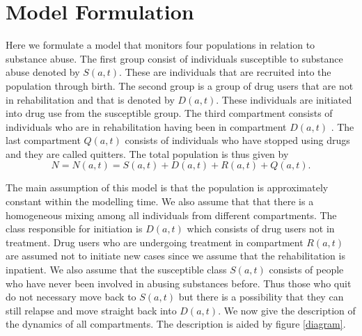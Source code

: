 %
%


\section{Model Formulation}
Here we formulate a model that monitors four populations in relation to substance abuse. The first group consist of individuals  susceptible to substance abuse denoted by $S(a,t)$. These are individuals that are recruited into the population through birth. The second group is a group of drug users that are not in rehabilitation and that is denoted by $D(a,t)$. These individuals are initiated into drug use from the susceptible group. The  third compartment consists of individuals who are in rehabilitation having been in compartment $D(a,t)$ . The last compartment $Q(a,t)$ consists of individuals who have stopped using drugs and they are called  quitters. The total population is thus given by \[N=N(a,t)=S(a,t)+D(a,t)+R(a,t)+Q(a,t).\]

The main assumption of this model is that the population is approximately constant within the modelling time. We also assume that that there is a homogeneous mixing among all individuals from different compartments. The class responsible for initiation is $D(a,t)$ which consists of drug users not in treatment. Drug users who are undergoing treatment in compartment $R(a,t)$ are assumed not to initiate new cases  since we assume that the rehabilitation is inpatient. We also assume that the susceptible class $S(a,t)$ consists of people who have never been involved in abusing substances before. Thus those who quit do not necessary move back to $S(a,t)$ but there is a possibility that they can still relapse and move straight back into $D(a,t)$. We now give the description of the dynamics of all compartments. The description is aided by  figure \ref{diagram}.

